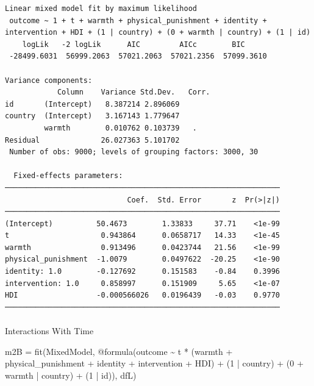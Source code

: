 \documentclass[
  letterpaper,
  DIV=11,
  numbers=noendperiod]{scrreprt}
\makeatletter
\let\oldparagraph\paragraph
\renewcommand{\paragraph}{
    \@ifstar
      \xxxParagraphStar
      \xxxParagraphNoStar
  }
\newcommand{\xxxParagraphStar}[1]{\oldparagraph*{#1}\mbox{}}
\newcommand{\xxxParagraphNoStar}[1]{\oldparagraph{#1}\mbox{}}
\newenvironment{Shaded}{\begin{snugshade}}{\end{snugshade}}
\newcommand{\FloatTok}[1]{\textcolor[rgb]{0.68,0.00,0.00}{#1}}
\newcommand{\FunctionTok}[1]{\textcolor[rgb]{0.28,0.35,0.67}{#1}}
\newcommand{\NormalTok}[1]{\textcolor[rgb]{0.00,0.23,0.31}{#1}}
\newcommand{\OperatorTok}[1]{\textcolor[rgb]{0.37,0.37,0.37}{#1}}
\newcommand{\PreprocessorTok}[1]{\textcolor[rgb]{0.68,0.00,0.00}{#1}}
\makeatother
\begin{document}
\begin{verbatim}
Linear mixed model fit by maximum likelihood
 outcome ~ 1 + t + warmth + physical_punishment + identity + intervention + HDI + (1 | country) + (0 + warmth | country) + (1 | id)
    logLik   -2 logLik      AIC         AICc        BIC     
 -28499.6031  56999.2063  57021.2063  57021.2356  57099.3610

Variance components:
            Column    Variance Std.Dev.   Corr.
id       (Intercept)   8.387214 2.896069
country  (Intercept)   3.167143 1.779647
         warmth        0.010762 0.103739   .  
Residual              26.027363 5.101702
 Number of obs: 9000; levels of grouping factors: 3000, 30

  Fixed-effects parameters:
───────────────────────────────────────────────────────────────
                            Coef.  Std. Error       z  Pr(>|z|)
───────────────────────────────────────────────────────────────
(Intercept)          50.4673        1.33833     37.71    <1e-99
t                     0.943864      0.0658717   14.33    <1e-45
warmth                0.913496      0.0423744   21.56    <1e-99
physical_punishment  -1.0079        0.0497622  -20.25    <1e-90
identity: 1.0        -0.127692      0.151583    -0.84    0.3996
intervention: 1.0     0.858997      0.151909     5.65    <1e-07
HDI                  -0.000566026   0.0196439   -0.03    0.9770
───────────────────────────────────────────────────────────────
\end{verbatim}

\paragraph{Interactions With Time}\label{interactions-with-time-2}

\begin{Shaded}
\begin{Highlighting}[]
\NormalTok{m2B }\OperatorTok{=} \FunctionTok{fit}\NormalTok{(MixedModel, }\PreprocessorTok{@formula}\NormalTok{(outcome }\OperatorTok{\textasciitilde{}}\NormalTok{ t }\OperatorTok{*}\NormalTok{ (warmth }\OperatorTok{+} 
\NormalTok{                                 physical\_punishment }\OperatorTok{+} 
\NormalTok{                                 identity }\OperatorTok{+}\NormalTok{ intervention }\OperatorTok{+} 
\NormalTok{                                   HDI) }\OperatorTok{+}
\NormalTok{                                 (}\FloatTok{1} \OperatorTok{|}\NormalTok{ country) }\OperatorTok{+}
\NormalTok{                                 (}\FloatTok{0} \OperatorTok{+}\NormalTok{ warmth }\OperatorTok{|}\NormalTok{ country) }\OperatorTok{+}
\NormalTok{                                 (}\FloatTok{1} \OperatorTok{|}\NormalTok{ id)), dfL)}
\end{Highlighting}
\end{Shaded}
\end{document}
